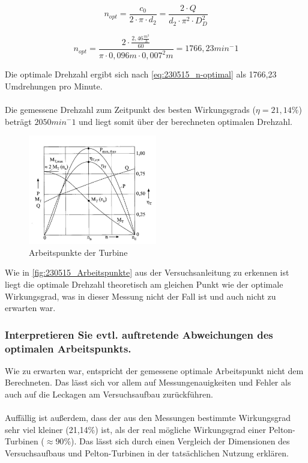\begin{equation}
 n_{opt}=\frac{c_{0}}{2 \cdot \pi \cdot d_{2}}=\frac{2 \cdot Q}{d_{2} \cdot \pi^2  \cdot D_{D}^2}
\label{eq:230515_n-optimal}
\end{equation}

\begin{equation}
n_{opt}=\frac{ 2 \cdot \frac{2,46 \frac{m^3}{h}}{60}}{\pi \cdot 0,096 m \cdot 0,007^2m}=1766,23  min^-1
\label{eq:230515_n-optimal2}
\end{equation}


 Die optimale Drehzahl ergibt sich nach \autoref{eq:230515_n-optimal} als 1766,23 Umdrehungen pro Minute.
\\\\
Die gemessene Drehzahl zum Zeitpunkt des besten Wirkungsgrads ($\eta=21,14\%$) beträgt $2050 min^-1$ und liegt somit über der berechneten optimalen Drehzahl. 

\begin{figure}[!ht]
		\centering
		\includegraphics[width=0.5\textwidth]{Abbildungen/Arbeitspunkte}
		\caption{Arbeitspunkte der Turbine}
		\label{fig:230515_Arbeitspunkte}
\end{figure}

Wie in \autoref{fig:230515_Arbeitspunkte} aus der Versuchsanleitung zu erkennen ist liegt die optimale Drehzahl theoretisch am gleichen Punkt wie der optimale Wirkungsgrad, was in dieser Messung nicht der Fall ist und auch nicht zu erwarten war.


\subsubsection{Interpretieren Sie evtl. auftretende Abweichungen des optimalen Arbeitspunkts.}

Wie zu erwarten war, entspricht der gemessene optimale Arbeitspunkt nicht dem Berechneten. Das lässt sich vor allem auf Messungenauigkeiten und Fehler als auch auf die Leckagen am Versuchsaufbau zurückführen. \\\\ Auffällig ist außerdem, dass der aus den Messungen bestimmte Wirkungsgrad sehr viel kleiner (21,14\%) ist, als der real mögliche Wirkungsgrad einer Pelton-Turbinen ($\approx90\%$). Das lässt sich durch einen Vergleich der Dimensionen des Versuchsaufbaus und Pelton-Turbinen in der tatsächlichen Nutzung erklären.


